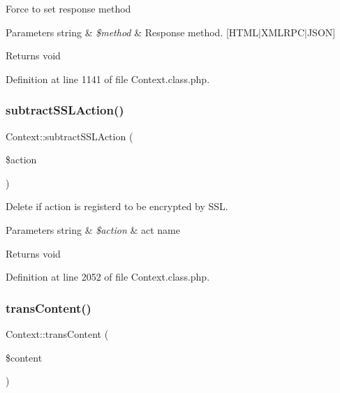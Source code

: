 Force to set response method


\begin{DoxyParams}[1]{Parameters}
string & {\em \$method} & Response method. \mbox{[}H\+T\+M\+L$\vert$\+X\+M\+L\+R\+P\+C$\vert$\+J\+S\+ON\mbox{]} \\
\hline
\end{DoxyParams}
\begin{DoxyReturn}{Returns}
void 
\end{DoxyReturn}


Definition at line 1141 of file Context.\+class.\+php.

\mbox{\label{classContext_a598cb5c571c0a1ffb15f67064e251f0d}} 
\subsubsection{\texorpdfstring{subtract\+S\+S\+L\+Action()}{subtractSSLAction()}}
{\footnotesize\ttfamily Context\+::subtract\+S\+S\+L\+Action (\begin{DoxyParamCaption}\item[{}]{\$action }\end{DoxyParamCaption})}

Delete if action is registerd to be encrypted by S\+SL.


\begin{DoxyParams}[1]{Parameters}
string & {\em \$action} & act name \\
\hline
\end{DoxyParams}
\begin{DoxyReturn}{Returns}
void 
\end{DoxyReturn}


Definition at line 2052 of file Context.\+class.\+php.

\mbox{\label{classContext_a4767b003bd726a994b1bf6bf68a3bb7e}} 
\subsubsection{\texorpdfstring{trans\+Content()}{transContent()}}
{\footnotesize\ttfamily Context\+::trans\+Content (\begin{DoxyParamCaption}\item[{}]{\$content }\end{DoxyParamCaption})}

